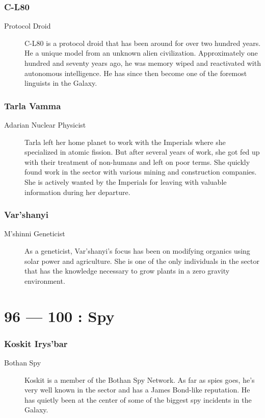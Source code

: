 \documentclass{article}
\begin{document}
\section{C-L80}
\begin{description}
	\item [Protocol Droid] C-L80 is a protocol droid that has been around for over two hundred years. He a unique model from an unknown alien civilization. Approximately one hundred and seventy years ago, he was memory wiped and reactivated with autonomous intelligence. He has since then become one of the foremost linguists in the Galaxy.
\end{description}
\section{Tarla Vamma}
\begin{description}
	\item [Adarian \female Nuclear Physicist] Tarla left her home planet to work with the Imperials where she specialized in atomic fission. But after several years of work, she got fed up with their treatment of non-humans and left on poor terms. She quickly found work in the sector with various mining and construction companies. She is actively wanted by the Imperials for leaving with valuable information during her departure.
\end{description}
\section{Var’shanyi}
\begin{description}
	\item [M’shinni \female Geneticist] As a geneticist, Var’shanyi’s focus has been on modifying organics using solar power and agriculture. She is one of the only individuals in the sector that has the knowledge necessary to grow plants in a zero gravity environment.
\end{description}

\part*{96 --- 100 : Spy}
\setcounter{section}{95}
\section{Koskit Irys’bar}
\begin{description}
	\item [Bothan \male Spy] Koskit is a member of the Bothan Spy Network. As far as spies goes, he’s very well known in the sector and has a James Bond-like reputation. He has quietly been at the center of some of the biggest spy incidents in the Galaxy.
\end{description}
\end{document}
